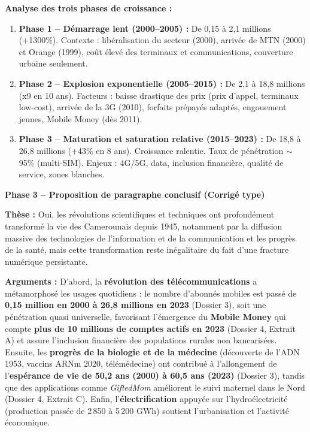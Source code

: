 \documentclass[11pt]{article}
\begin{document}
\begin{exoresolu}
\medskip
\noindent \textbf{Analyse des trois phases de croissance :}
\begin{enumerate}
    \item \textbf{Phase 1 -- Démarrage lent (2000--2005) :} De 0,15 à 2,1 millions (+1300\%). Contexte : libéralisation du secteur (2000), arrivée de MTN (2000) et Orange (1999), coût élevé des terminaux et communications, couverture urbaine seulement.
    \item \textbf{Phase 2 -- Explosion exponentielle (2005--2015) :} De 2,1 à 18,8 millions (x9 en 10 ans). Facteurs : baisse drastique des prix (prix d'appel, terminaux low-cost), arrivée de la 3G (2010), forfaits prépayés adaptés, engouement jeunes, Mobile Money (dès 2011).
    \item \textbf{Phase 3 -- Maturation et saturation relative (2015--2023) :} De 18,8 à 26,8 millions (+43\% en 8 ans). Croissance ralentie. Taux de pénétration $\sim$ 95\% (multi-SIM). Enjeux : 4G/5G, data, inclusion financière, qualité de service, zones blanches.
\end{enumerate}

\medskip
\noindent \textbf{Phase 3 -- Proposition de paragraphe conclusif (Corrigé type)}

\medskip
\noindent \textbf{Thèse :} Oui, les révolutions scientifiques et techniques ont profondément transformé la vie des Camerounais depuis 1945, notamment par la diffusion massive des technologies de l'information et de la communication et les progrès de la santé, mais cette transformation reste inégalitaire du fait d'une fracture numérique persistante.

\medskip
\noindent \textbf{Arguments :} D'abord, la \textbf{révolution des télécommunications} a métamorphosé les usages quotidiens : le nombre d'abonnés mobiles est passé de \textbf{0,15 million en 2000 à 26,8 millions en 2023} (Dossier 3), soit une pénétration quasi universelle, favorisant l'émergence du \textbf{Mobile Money} qui compte \textbf{plus de 10 millions de comptes actifs en 2023} (Dossier 4, Extrait A) et assure l'inclusion financière des populations rurales non bancarisées. Ensuite, les \textbf{progrès de la biologie et de la médecine} (découverte de l'ADN 1953, vaccins ARNm 2020, télémédecine) ont contribué à l'allongement de l'\textbf{espérance de vie de 50,2 ans (2000) à 60,5 ans (2023)} (Dossier 3), tandis que des applications comme \emph{GiftedMom} améliorent le suivi maternel dans le Nord (Dossier 4, Extrait C). Enfin, l'\textbf{électrification} appuyée sur l'hydroélectricité (production passée de 2\,850 à 5\,200 GWh) soutient l'urbanisation et l'activité économique.


\end{exoresolu}
\end{document}
